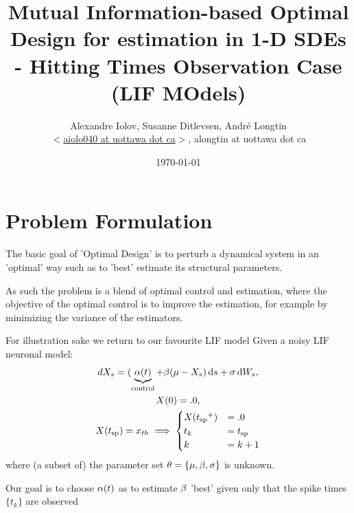 \documentclass{article}
\begin{document}
\title{Mutual Information-based Optimal Design for estimation in 1-D SDEs -
Hitting Times Observation Case (LIF MOdels)} 
\author{Alexandre Iolov, Susanne Ditlevsen, Andr\'e Longtin  \\
$<$\href{mailto:aiolo040@uottawa.ca}
		{aiolo040 at uottawa dot ca}$>$, alongtin at uottawa dot ca}

\date{\today}

\maketitle 

 
\tableofcontents

\section{Problem Formulation}
The basic goal of 'Optimal Design' is to perturb a dynamical system in an
'optimal' way such as to 'best' estimate its structural parameters. 

As such the problem is a blend of optimal control and estimation, where the
objective of the optimal control is to improve the estimation, for example by
minimizing the variance of the estimators. 

For illustration sake we return to our favourite LIF model
Given a noisy LIF neuronal model:
\begin{equation}
\begin{gathered}
dX_s = (\underbrace{\a(t)}_{\textrm{control}} + \b(\m %
 - {X_s} ) \intd{s} + \s\intd{W_s},
\\
X(0) = .0,
\\
X(\ts) = \xth \implies  
\begin{cases}
X(\ts^+) &= .0   
\\
t_k &=  \ts
\\
k  &= k+1
\end{cases}
\end{gathered}
\label{eq:X_evolution_uo}
\end{equation}
where (a subset of) the parameter set ${\theta} = \{{\mu }, {\beta}, {\sigma }\}$ is unknown.

Our goal is to choose ${\alpha}(t)$ as to estimate ${\beta}$ 'best' given only that the
spike times $\{t_k\}$ are observed 
 
\end{document}
